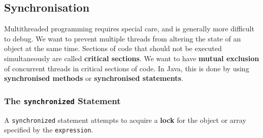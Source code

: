\documentclass[a4paper,11pt]{article}
\begin{document}
\subsection{Synchronisation}
Multithreaded programming requires special care, and is generally more difficult to debug.
We want to prevent multiple threads from altering the state of an object at the same time.
Sections of code that should not be executed simultaneously are called \textbf{critical sections}.
We want to have \textbf{mutual exclusion} of concurrent threads in critical sections of code.
In Java, this is done by using \textbf{synchronised methods} or \textbf{synchronised statements}.

\subsubsection{The \texttt{synchronized} Statement}
A \texttt{synchronized} statement attempts to acquire a \textbf{lock} for the object or array 
specified by the \texttt{expression}.
\end{document}
